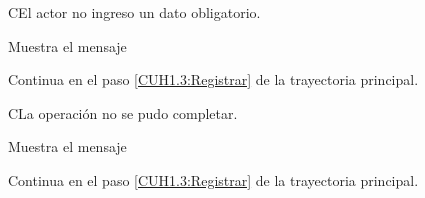 \begin{UCtrayectoriaA}{C}{El actor no ingreso un dato obligatorio.}
		
	\UCpaso[\UCsist] Muestra el mensaje 
	
	\UCpaso Continua en el paso \ref{CUH1.3:Registrar} de la trayectoria principal.
		
\end{UCtrayectoriaA}

\begin{UCtrayectoriaA}{C}{La operación no se pudo completar.}
		
	\UCpaso[\UCsist] Muestra el mensaje 
		
	\UCpaso Continua en el paso \ref{CUH1.3:Registrar} de la trayectoria principal.
		
\end{UCtrayectoriaA}
